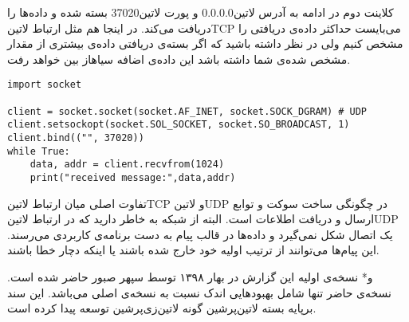 \documentclass[]{article}
\begin{document}
  کلاینت دوم در ادامه به آدرس ‌لاتین{0.0.0.0} و پورت ‌لاتین{37020} بسته شده و داده‌ها را دریافت می‌کند.
  در اینجا هم مثل ارتباط ‌لاتین{TCP} می‌بایست حداکثر داده‌ی دریافتی را مشخص کنیم ولی در نظر داشته باشید که اگر بسته‌ی دریافتی
  داده‌ی بیشتری از مقدار مشخص شده‌ی شما داشته باشد این داده‌ی اضافه ‌سیاه{از بین خواهد رفت}.

  \begin{latin}
  \begin{verbatim}
import socket

client = socket.socket(socket.AF_INET, socket.SOCK_DGRAM) # UDP
client.setsockopt(socket.SOL_SOCKET, socket.SO_BROADCAST, 1)
client.bind(("", 37020))
while True:
    data, addr = client.recvfrom(1024)
    print("received message:",data,addr)
  \end{verbatim}
  \end{latin}

  تفاوت اصلی میان ارتباط ‌لاتین{TCP} و ‌لاتین{UDP} در چگونگی ساخت سوکت و توابع ارسال و دریافت اطلاعات است.
  البته از شبکه به خاطر دارید که در ارتباط ‌لاتین{UDP} یک اتصال شکل نمی‌گیرد
  و داده‌ها در قالب پیام به دست برنامه‌ی کاربردی می‌رسند.
  این پیام‌ها می‌توانند از ترتیب اولیه خود خارج شده باشند یا اینکه دچار خطا باشند.

  ‌و*{}
  نسخه‌ی اولیه این گزارش در بهار ۱۳۹۸ توسط سپهر صبور حاضر شده است. نسخه‌ی حاضر تنها شامل بهبودهایی اندک نسبت به نسخه‌ی اصلی می‌باشد.
  این سند برپایه بسته ‌لاتین{‌پرشین} گونه ‌لاتین{‌زی‌پرشین} توسعه پیدا کرده است.
\end{document}
